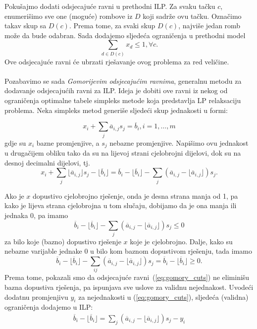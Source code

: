 \documentclass[a4paper, utf8, 11pt, colorlinks]{book}
\begin{document}
Pokušajmo dodati odsjecajuće ravni u prethodni ILP. Za svaku tačku $c$, enumerišimo sve one (moguće) rombove iz $D$ koji sadrže ovu tačku. Označimo takav skup sa $D(c)$. Prema tome, za svaki skup $D(c)$, najviše jedan romb može da bude odabran. Sada dodajemo sljedeća ograničenja u prethodni model
\begin{equation}
     \sum_{d \in D(c)} x_d \leq 1, \forall c.
\end{equation}
Ove odsjecajuće ravni će ubrzati rješavanje ovog problema za   red veličine.\\ \vspace{0.2cm} \\

Pozabavimo se sada \emph{Gomorijevim odsjecajućim ravnima}, generalnu metodu za dodavanje odsjecajućih ravni za  ILP.  Ideja je dobiti ove ravni iz nekog od ograničenja optimalne tabele simpleks metode koja predstavlja LP relaksaciju problema. Neka simpleks metod generiše sljedeći skup jednakosti u formi:

$$x_i + \sum_{ j} \overline{a}_{i,j} s_j= \overline{b}_i, i=1, \ldots,m$$
gdje su $x_i$ bazne promjenjive, a $s_j$ nebazne promjenjive. Napišimo ovu jednakost u drugačijem obliku tako da su na lijevoj strani cjelobrojni dijelovi, dok su na desnoj decimalni dijelovi, tj.
$$x_i + \sum_{j} \lfloor \overline{a}_{i,j} \rfloor s_j - \lfloor \overline{b}_i \rfloor = \overline{b}_i - \lfloor \overline{b}_i  \rfloor    - \sum_{j} (\overline{a}_{i,j} - \lfloor \overline{a}_{i,j} \rfloor) s_j.$$

Ako je $x$ dopustivo cjelobrojno rješenje, onda je desna strana manja od 1, pa kako je lijeva strana cjelobrojna u tom slučaju, dobijamo da je ona manja ili jednaka 0, pa imamo
\begin{equation}\label{eq:gomory_cuts}
    \overline{b}_i - \lfloor \overline{b}_i  \rfloor    - \sum_{j} (\overline{a}_{i,j} - \lfloor \overline{a}_{i,j} \rfloor) s_j \leq 0
\end{equation}
za bilo koje (bazno) dopustivo rješenje $x$ koje je cjelobrojno. Dalje, kako su nebazne varijable jednake 0 u bilo kom baznom dopustivom rješenju, tada imamo 
$$ \overline{b}_i - \lfloor \overline{b}_i  \rfloor    - \sum_{ij} (\overline{a}_{i,j} - \lfloor \overline{a}_{i,j} \rfloor) s_j = \overline{b}_i - \lfloor \overline{b}_i \rfloor  \geq 0.$$
Prema tome, pokazali smo da odsjecajuće ravni~(\ref{eq:gomory_cuts}) ne eliminišu bazna dopustiva rješenja, pa ispunjava sve uslove za validnu nejednakost. Uvodeći dodatnu promjenjivu $y_i$ za nejednakosti u (\ref{eq:gomory_cuts}), sljedeća (validna) ograničenja dodajemo u ILP:
\begin{align}\label{gomory_cplex}
       \overline{b}_i - \lfloor \overline{b}_i \rfloor=   \sum_{j} (\overline{a}_{i,j} - \lfloor \overline{a}_{i,j} \rfloor)s_j - y_i 
\end{align}
\end{document}
